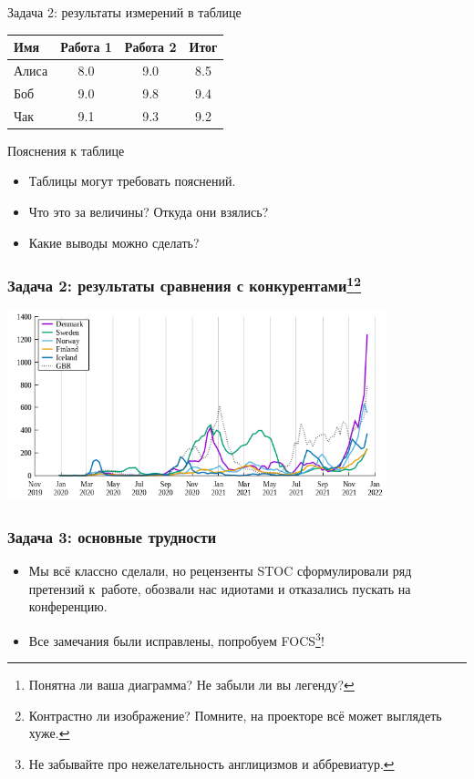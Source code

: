 \documentclass[14pt,aspectratio=169,hyperref={pdftex,unicode},xcolor=dvipsnames]{beamer}
\begin{document}
\begin{frame}{Задача 2: результаты измерений в таблице}
\centering
\begin{tabular}{lccc}
    Имя & Работа 1 & Работа 2 & Итог \\
\hline\hline
    Алиса & 8.0 & 9.0 & 8.5 \\
    Боб & 9.0 & 9.8 & 9.4 \\
    Чак & 9.1 & 9.3 & 9.2 \\
\end{tabular}

\begin{block}{Пояснения к таблице}
  \begin{itemize}
  \item Таблицы могут требовать пояснений.
  \item Что это за величины? Откуда они взялись?
  \item Какие выводы можно сделать?
  \end{itemize}
\end{block}

\end{frame}


\begin{frame}
\frametitle{Задача 2: результаты сравнения с конкурентами\footnote{Понятна ли ваша диаграмма? Не забыли ли вы легенду?}\footnote{Контрастно ли изображение? Помните, на проекторе всё может выглядеть хуже.}}
\begin{center}
\includegraphics[width=11cm]{images/graph.png}
\end{center}
\end{frame}

\begin{frame}
\frametitle{Задача 3: основные трудности}
\begin{itemize}
\item Мы всё классно сделали, но рецензенты STOC сформулировали ряд претензий к~работе, обозвали нас идиотами и отказались пускать на конференцию.
\item Все замечания были исправлены, попробуем FOCS\footnote{Не забывайте про нежелательность англицизмов и аббревиатур.}!
\end{itemize}

\end{frame}
\end{document}
